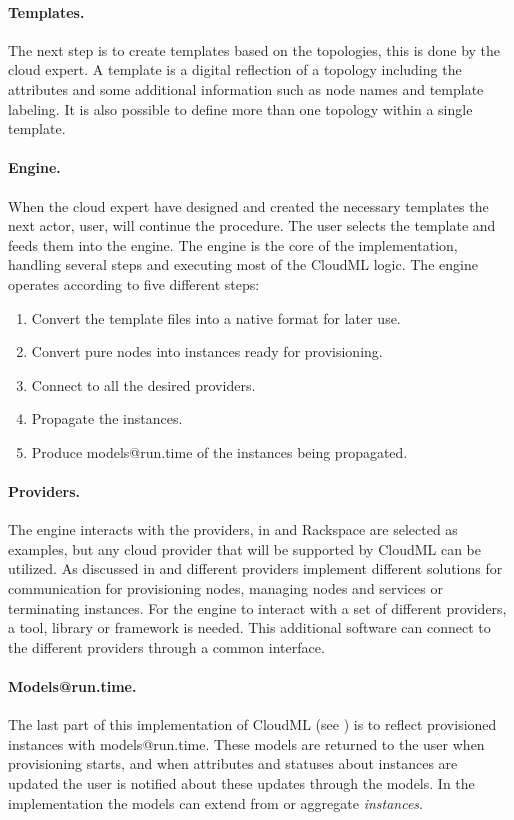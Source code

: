 \paragraph{Templates.}

The next step is to create templates based on the topologies, this is done by
the cloud expert.
A template is a digital reflection of a topology including the attributes and some additional 
information such as node names and template labeling.
It is also possible to define more than one topology within a single template.

\paragraph{Engine.}

When the cloud expert have designed and created the necessary templates the next actor, 
user, will continue the procedure.
The user selects the template and feeds them into the engine.
The engine is the core of the implementation, handling several steps and executing
most of the CloudML logic.
The engine operates according to five different steps:
\begin{enumerate}
  \item Convert the template files into a native format for later use.
  \item Convert pure nodes into instances ready for provisioning.
  \item Connect to all the desired providers.
  \item Propagate the instances.
  \item Produce models@run.time of the instances being propagated.
\end{enumerate}

\paragraph{Providers.}

The engine interacts with the providers, in  
 and Rackspace are selected as examples, but any
cloud provider that will be supported by CloudML can be utilized.
As discussed in  and 
different providers implement different solutions for communication
\eg for provisioning nodes, managing nodes and services or terminating instances.
For the engine to interact with a set of different providers, 
a tool, library or framework is needed.
This additional software can connect to the different providers through a common interface.

\paragraph{Models@run.time.}

The last part of this implementation of CloudML (see ) is to
reflect provisioned instances with models@run.time.
These models are returned to the user when provisioning starts, 
and when attributes and statuses about instances are updated the user is 
notified about these updates through the models.
In the implementation the models can extend from or aggregate \emph{instances}.
